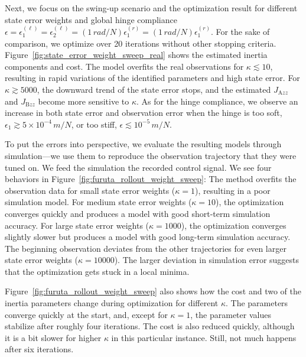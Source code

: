 \documentclass[preprint,12pt]{elsarticle}
\newcommand\figref{Figure~\ref}
\numberwithin{equation}{section}
\def\tA{\text{A}}
\def\tB{\text{B}}
\def\stateweight{\kappa}
\begin{document}
Next, we focus on the swing-up scenario and the optimization result for different state error weights and global hinge compliance $\epsilon = \epsilon_1^{(\ell)} = \epsilon_2^{(\ell)} = (1\,\si{rad/N}) \epsilon_1^{(r)} = (1\,\si{rad/N}) \epsilon_1^{(r)}$. For the sake of comparison, we optimize over 20 iterations without other stopping criteria.
\figref{fig:state_error_weight_sweep_real} shows the estimated inertia components and cost.
The model overfits the real observations for $\stateweight \lesssim 10$, resulting in rapid variations of the identified parameters and high state error.
For $\kappa \gtrsim 5000$, the downward trend of the state error stops, and the estimated $J_{\tA zz}$ and $J_{\tB zz}$ become more sensitive to $\kappa$.
As for the hinge compliance, we observe an increase in both state error and observation error when the hinge is too soft, $\epsilon_1 \gtrsim 5 \times 10^{-4}\,\si{m/N}$, or too stiff, $\epsilon \lesssim 10^{-5}\,\si{m/N}$.

To put the errors into perspective, we evaluate the resulting models through simulation---we use them to reproduce the observation trajectory that they were tuned on.
We feed the simulation the recorded control signal.
We see four behaviors in \figref{fig:furuta_rollout_weight_sweep}:
The method overfits the observation data for small state error weights ($\stateweight = 1$), resulting in a poor simulation model.
For medium state error weights ($\stateweight = 10$), the optimization converges quickly and produces a model with good short-term simulation accuracy.
For large state error weights ($\stateweight = 1000$), the optimization converges slightly slower but produces a model with good long-term simulation accuracy.
The beginning observation deviates from the other trajectories for even larger state error weights ($\stateweight = 10000$).
The larger deviation in simulation error suggests that the optimization gets stuck in a local minima.

\figref{fig:furuta_rollout_weight_sweep} also shows how the cost and two of the inertia parameters change during optimization for different $\stateweight$.
The parameters converge quickly at the start, and, except for $\kappa=1$, the parameter values stabilize after roughly four iterations.
The cost is also reduced quickly, although it is a bit slower for higher $\kappa$ in this particular instance.
Still, not much happens after six iterations.
    
\end{document}
